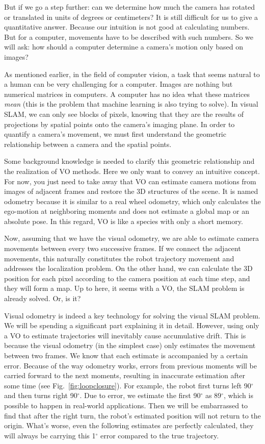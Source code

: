 But if we go a step further: can we determine how much the camera has rotated or translated in units of degrees or centimeters? It is still difficult for us to give a quantitative answer. Because our intuition is not good at calculating numbers. But for a computer, movements have to be described with such numbers. So we will ask: how should a computer determine a camera's motion only based on images?

As mentioned earlier, in the field of computer vision, a task that seems natural to a human can be very challenging for a computer. Images are nothing but numerical matrices in computers. A computer has no idea what these matrices \textit{mean} (this is the problem that machine learning is also trying to solve). In visual SLAM, we can only see blocks of pixels, knowing that they are the results of projections by spatial points onto the camera's imaging plane. In order to quantify a camera's movement, we must first {understand the geometric relationship between a camera and the spatial points}.

Some background knowledge is needed to clarify this geometric relationship and the realization of VO methods. Here we only want to convey an intuitive concept. For now, you just need to take away that VO can estimate camera motions from images of adjacent frames and restore the 3D structures of the scene. It is named odometry because it is similar to a real wheel odometry, which only calculates the ego-motion at neighboring moments and does not estimate a global map or an absolute pose. In this regard, VO is like a species with only a short memory.

Now, assuming that we have the visual odometry, we are able to estimate camera movements between every two successive frames. If we connect the adjacent movements, this naturally constitutes the robot trajectory movement and addresses the localization problem. On the other hand, we can calculate the 3D position for each pixel according to the camera position at each time step, and they will form a map. Up to here, it seems with a VO, the SLAM problem is already solved. Or, is it?

Visual odometry is indeed a key technology for solving the visual SLAM problem. We will be spending a significant part explaining it in detail. However, using only a VO to estimate trajectories will inevitably cause {accumulative drift}. This is because the visual odometry (in the simplest case) only estimates the movement between two frames. We know that each estimate is accompanied by a certain error. Because of the way odometry works, errors from previous moments will be carried forward to the next moments, resulting in inaccurate estimation after some time (see Fig.~\ref{fig:loopclosure}). For example, the robot first turns left 90$^\circ$ and then turns right 90$^\circ$. Due to error, we estimate the first 90$^\circ$ as 89$^\circ$, which is possible to happen in real-world applications. Then we will be embarrassed to find that after the right turn, the robot's estimated position will not return to the origin. What's worse, even the following estimates are perfectly calculated, they will always be carrying this 1$^\circ$ error compared to the true trajectory.

